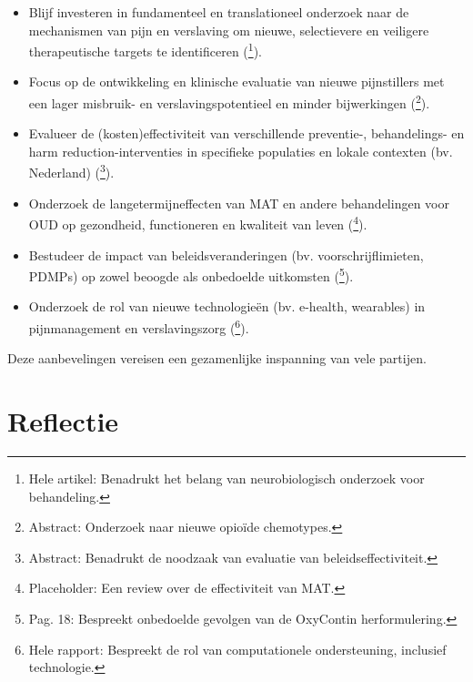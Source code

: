 \documentclass[11pt, a4paper]{report} %
\begin{document}
\begin{itemize}
        \begin{itemize}
            \item Blijf investeren in fundamenteel en translationeel onderzoek naar de mechanismen van pijn en verslaving om nieuwe, selectievere en veiligere therapeutische targets te identificeren (\cite{Kosten2002NeurobiologyDependence}\footnote{Hele artikel: Benadrukt het belang van neurobiologisch onderzoek voor behandeling.}).
            \item Focus op de ontwikkeling en klinische evaluatie van nieuwe pijnstillers met een lager misbruik- en verslavingspotentieel en minder bijwerkingen (\cite{Feinberg2018MLMolecularDynamicsOpioid}\footnote{Abstract: Onderzoek naar nieuwe opioïde chemotypes.}).
            \item Evalueer de (kosten)effectiviteit van verschillende preventie-, behandelings- en harm reduction-interventies in specifieke populaties en lokale contexten (bv. Nederland) (\cite{Schuler2020StateScienceOpioidPolicy}\footnote{Abstract: Benadrukt de noodzaak van evaluatie van beleidseffectiviteit.}).
            \item Onderzoek de langetermijneffecten van MAT en andere behandelingen voor OUD op gezondheid, functioneren en kwaliteit van leven (\cite{SAMHSA_MAT_EffectivenessReview}\footnote{Placeholder: Een review over de effectiviteit van MAT.}).
            \item Bestudeer de impact van beleidsveranderingen (bv. voorschrijflimieten, PDMPs) op zowel beoogde als onbedoelde uitkomsten (\cite{Maclean2020EconomicStudiesOpioid}\footnote{Pag. 18: Bespreekt onbedoelde gevolgen van de OxyContin herformulering.}).
            \item Onderzoek de rol van nieuwe technologieën (bv. e-health, wearables) in pijnmanagement en verslavingszorg (\cite{Yarosh2020ComputationalSupportSUD}\footnote{Hele rapport: Bespreekt de rol van computationele ondersteuning, inclusief technologie.}).
        \end{itemize}
\end{itemize}
Deze aanbevelingen vereisen een gezamenlijke inspanning van vele partijen.

\chapter{Reflectie}
\label{ch:reflectie}
\end{document}
